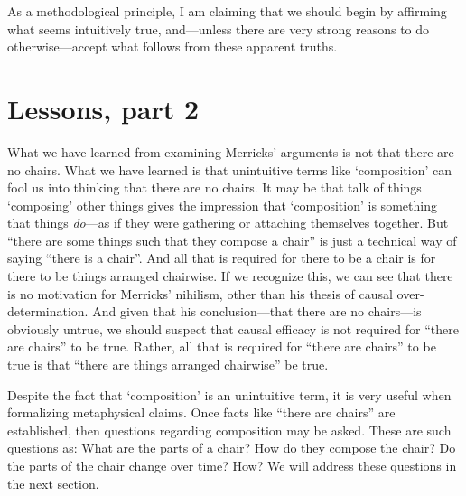 \documentclass[11pt]{article}
\begin{document}
\begin{spacing}{1.25}
As a methodological principle, I am claiming that we should begin by
affirming what seems intuitively true, and---unless there are very
strong reasons to do otherwise---accept what follows from these
apparent truths.

\section{Lessons, part 2}
\label{lessons-m}
What we have learned from examining Merricks' arguments is not that
there are no chairs.  What we have learned is that unintuitive terms
like `composition' can fool us into thinking that there are no chairs.
It may be that talk of things `composing' other things gives the
impression that `composition' is something that things {\em do}---as
if they were gathering or attaching themselves together.  But ``there
are some things such that they compose a chair'' is just a technical
way of saying ``there is a chair''.  And all that is required for
there to be a chair is for there to be things arranged chairwise.  If
we recognize this, we can see that there is no motivation for
Merricks' nihilism, other than his thesis of causal
over-determination.  And given that his conclusion---that there are no
chairs---is obviously untrue, we should suspect that causal efficacy
is not required for ``there are chairs'' to be true.  Rather, all that
is required for ``there are chairs'' to be true is that ``there are
things arranged chairwise'' be true.

Despite the fact that `composition' is an unintuitive term, it is very
useful when formalizing metaphysical claims.  Once facts like ``there
are chairs'' are established, then questions regarding composition may
be asked.  These are such questions as: What are the parts of a chair?
How do they compose the chair?  Do the parts of the chair change over
time?  How?  We will address these questions in the next section.
\ifstandalone
\end{spacing}


\fi
\end{document}
